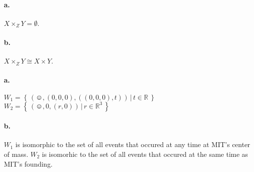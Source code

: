 \paragraph{a.}
$X \times_Z Y = \emptyset$.
\paragraph{b.}
$X \times_Z Y \cong X \times Y$.


\paragraph{a.}
$W_1 = \left\{\,\left(\smiley,(0,0,0),((0,0,0),t)\right)\,\vert\,t\in\mathbb{R}\,\right\}$
$W_2 = \left\{\,\left(\smiley,0,(r,0)\right)\,\vert\,r\in\mathbb{R}^3\,\right\}$
\paragraph{b.}
$W_1$ is isomorphic to the set of all events that occured at any time
at MIT's center of mass.  $W_2$ is isomorhic to the set of all events
that occured at the same time as MIT's founding.


